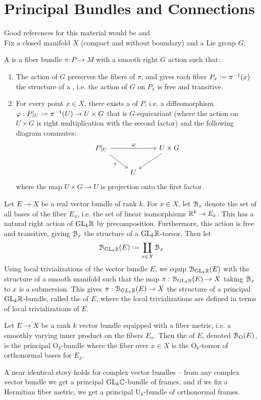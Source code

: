 %
\section{Principal Bundles and Connections}
%
Good references for this material would be \cite{KobNom} and \cite{Tu} \\

Fix a closed manifold $X$ (compact and without boundary) and a Lie group $G$.
%
\begin{defn}
A  is a fiber bundle $\pi : P \to M$ with a smooth
right $G$ action such that:
\begin{enumerate}
  \item The action of $G$ preserves the fibers of $\pi$, and gives each fiber
  $P_x \vcentcolon= \pi^{-1}(x)$ the structure of a , i.e. the
  action of $G$ on $P_x$ is free and transitive.
  \item For every point $x \in X$, there exists a  of
  $P$, i.e. a diffeomorphism $\varphi : P\vert_U \vcentcolon= \pi^{-1}(U) \to U \times G$
  that is $G$-equivariant (where the action on $U \times G$ is right multiplication
  with the second factor) and the following diagram commutes:
  \[\begin{tikzcd}
  P\vert_U \ar[rr, "\varphi"] \ar[dr, "\pi"'] && U \times G \ar[dl] \\
  & U
  \end{tikzcd}\]
  where the map $U\times G \to U$ is projection onto the first factor.
\end{enumerate}
\end{defn}
%
\begin{exmp}
Let $E \to X$ be a real vector bundle of rank $k$. For $x \in X$, let $\mathcal{B}_x$
denote the set of all bases of the fiber $E_x$, i.e. the set of linear isomorphisms
$\mathbb{R}^k \to E_x$. This has a natural right action of $\mathrm{GL}_k\mathbb{R}$ by precomposition.
Furthermore, this action is free and transitive, giving $\mathcal{B}_x$ the structure
of a $\mathrm{GL}_k\mathbb{R}$-torsor. Then let
\[
\mathcal{B}_{\mathrm{GL}_k\mathbb{R}}(E) \vcentcolon= \coprod_{x \in X}\mathcal{B}_x
\]
Using local trivializations of the vector bundle $E$, we equip $\mathcal{B}_{\mathrm{GL}_k\mathbb{R}}(E)$
with the structure of a smooth manifold such that the map
$\pi : \mathcal{B}_{\mathrm{GL}_k\mathbb{R}}(E) \to X$ taking $\mathcal{B}_x$ to $x$ is a submersion. This gives
$\pi : \mathcal{B}_{GL_k\mathbb{R}}(E) \to X$ the structure of a principal $\mathrm{GL}_k\mathbb{R}$-bundle, called
the  of $E$,  where the local trivializations are defined in terms of
local trivializations of $E$.
\end{exmp}
%
\begin{exmp}
Let $E \to X$ be a rank $k$ vector bundle equipped with a fiber metric, i.e. a
smoothly  varying inner product on the fibers $E_x$. Then the
 of $E$, denoted $\mathcal{B}_{\mathrm{O}}(E)$, is the principal
$\mathrm{O}_k$-bundle where the fiber over $x \in X$ is the $\mathrm{O}_k$-torsor
of orthonormal bases for $E_x$.
\end{exmp}
%
A near identical story holds for complex vector bundles -- from any complex
vector bundle we get a principal $\mathrm{GL}_k\mathbb{C}$-bundle of frames, and if
we fix a Hermitian fiber metric, we get a principal $\mathrm{U}_k$-bundle of
orthonormal frames. \\

